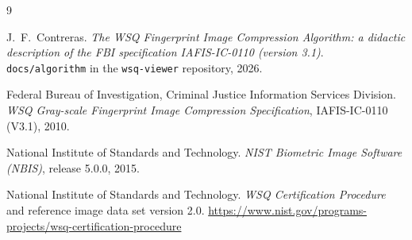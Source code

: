 \begin{thebibliography}{9}
\small

J.~F.~Contreras.
\emph{The WSQ Fingerprint Image Compression Algorithm: a didactic description of the FBI
specification IAFIS-IC-0110 (version 3.1)}. \texttt{docs/algorithm} in the \texttt{wsq-viewer}
repository, 2026.

Federal Bureau of Investigation, Criminal Justice Information Services Division.
\emph{WSQ Gray-scale Fingerprint Image Compression Specification}, IAFIS-IC-0110 (V3.1), 2010.

National Institute of Standards and Technology.
\emph{NIST Biometric Image Software (NBIS)}, release 5.0.0, 2015.

National Institute of Standards and Technology.
\emph{WSQ Certification Procedure} and reference image data set version 2.0.
\url{https://www.nist.gov/programs-projects/wsq-certification-procedure}

\end{thebibliography}
